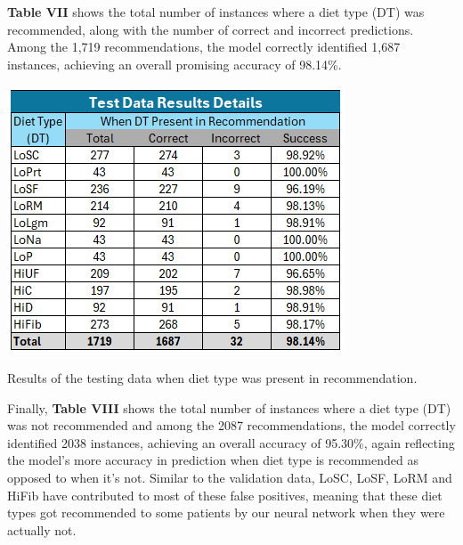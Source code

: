 \textbf{Table VII} shows the total number of instances where a diet type (DT) was recommended, along with the number of correct and incorrect predictions. Among the 1,719 recommendations, the model correctly identified 1,687 instances, achieving an overall promising accuracy of 98.14\%.

\begin{table}[H]
    \centering
    \includegraphics[width=\linewidth]{Figures/tdrdp.png}
    \caption{Results of the testing data when diet type was present in recommendation.}
\end{table}

Finally, \textbf{Table VIII} shows the total number of instances where a diet type (DT) was not recommended and among the 2087 recommendations, the model correctly identified 2038 instances, achieving an overall accuracy of 95.30\%, again reflecting the model's more accuracy in prediction when diet type is recommended as opposed to when it's not. Similar to the validation data, LoSC, LoSF, LoRM and HiFib have contributed to most of these false positives, meaning that these diet types got recommended to some patients by our neural network when they were actually not.


